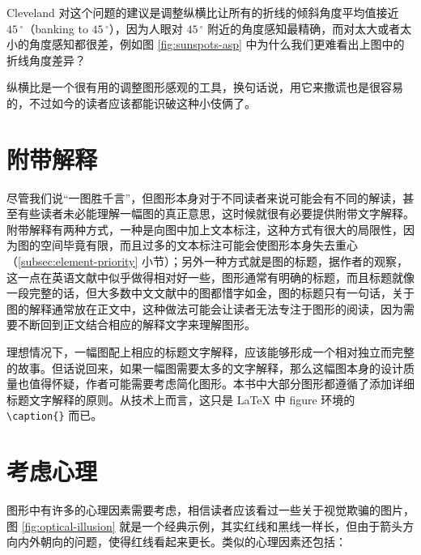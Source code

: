 \documentclass[
  b5paper,
  UTF8,twoside]{book}
\begin{document}
Cleveland 对这个问题的建议是调整纵横比让所有的折线的倾斜角度平均值接近 \(45\,^{\circ}\)（banking to \(45\,^{\circ}\)），因为人眼对 \(45\,^{\circ}\) 附近的角度感知最精确，而对太大或者太小的角度感知都很差，例如图 \ref{fig:sunspots-asp} 中为什么我们更难看出上图中的折线角度差异？

纵横比是一个很有用的调整图形感观的工具，换句话说，用它来撒谎也是很容易的，不过如今的读者应该都能识破这种小伎俩了。

\section{附带解释}\label{ux9644ux5e26ux89e3ux91ca}

尽管我们说``一图胜千言''，但图形本身对于不同读者来说可能会有不同的解读，甚至有些读者未必能理解一幅图的真正意思，这时候就很有必要提供附带文字解释。附带解释有两种方式，一种是向图中加上文本标注，这种方式有很大的局限性，因为图的空间毕竟有限，而且过多的文本标注可能会使图形本身失去重心（\ref{subsec:element-priority} 小节）；另外一种方式就是图的标题，据作者的观察，这一点在英语文献中似乎做得相对好一些，图形通常有明确的标题，而且标题就像一段完整的话，但大多数中文文献中的图都惜字如金，图的标题只有一句话，关于图的解释通常放在正文中，这种做法可能会让读者无法专注于图形的阅读，因为需要不断回到正文结合相应的解释文字来理解图形。

理想情况下，一幅图配上相应的标题文字解释，应该能够形成一个相对独立而完整的故事。但话说回来，如果一幅图需要太多的文字解释，那么这幅图本身的设计质量也值得怀疑，作者可能需要考虑简化图形。本书中大部分图形都遵循了添加详细标题文字解释的原则。从技术上而言，这只是 LaTeX 中 figure 环境的 \texttt{\textbackslash{}caption\{\}} 而已。

\section{考虑心理}\label{sec:psychology}

图形中有许多的心理因素需要考虑，相信读者应该看过一些关于视觉欺骗的图片，图 \ref{fig:optical-illusion} 就是一个经典示例，其实红线和黑线一样长，但由于箭头方向内外朝向的问题，使得红线看起来更长。类似的心理因素还包括：
\end{document}
